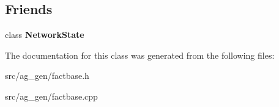 \subsection*{Friends}
\begin{DoxyCompactItemize}
\item 
\mbox{\label{class_factbase_af864ca38a6023b709224f8ceb6b37e9f}} 
class {\bfseries Network\+State}
\end{DoxyCompactItemize}


The documentation for this class was generated from the following files\+:\begin{DoxyCompactItemize}
\item 
src/ag\+\_\+gen/factbase.\+h\item 
src/ag\+\_\+gen/factbase.\+cpp\end{DoxyCompactItemize}
